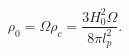 \begin{equation}
\rho _{0}=\Omega \rho _{c}=\frac{3H_{0}^{2}\Omega }{8\pi l_{p}^{2}}.
\end{equation}

